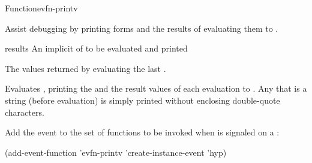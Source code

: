 \documentclass[10pt,twoside,english,pdftex]{article}
\begin{document}

\begin{functiondoc}{Function}{evfn-printv}{ 
    }
% 

\fnsyntax

\fnpurpose Assist debugging by printing forms and the results of
evaluating them to .

\fnpackage {}

\fnmodule {}

\fnargs
\begin{args}{results}
\arg[forms] An implicit  of  to be
evaluated and printed  
\end{args}

\fnreturns The values returned by evaluating the last .

\fndescription Evaluates , printing the  and the
result values of each evaluation to .
Any that is a string (before evaluation) is simply printed without
enclosing double-quote characters.

\fnexamples
{}%
Add the event   to the set of functions
to be invoked when  is signaled on a
 :
%
\W\supp
\begin{example}
  (add-event-function 'evfn-printv 'create-instance-event 'hyp)
\end{example}

\end{functiondoc}

\end{document}
